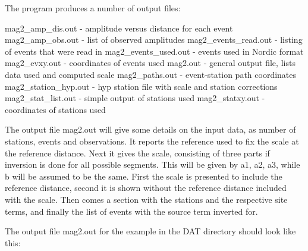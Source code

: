 The program produces a number of output files:

mag2\_amp\_dis.out - amplitude versus distance for each event\newline
mag2\_amp\_obs.out - list of observed amplitudes\newline
mag2\_events\_read.out - listing of events that were read in\newline
mag2\_events\_used.out - events used in Nordic format\newline
mag2\_evxy.out - coordinates of events used\newline
mag2.out - general output file, lists data used and computed scale\newline
mag2\_paths.out - event-station path coordinates\newline
mag2\_station\_hyp.out - hyp station file with scale and station corrections\newline
mag2\_stat\_list.out - simple output of stations used\newline
mag2\_statxy.out - coordinates of stations used\newline

The output file mag2.out will give some details on the input data, as number of 
stations, events and observations. It reports the reference used to fix the scale at 
the reference distance. Next it gives the scale, consisting of three parts if inversion 
is done for all possible segments. This will be given by a1, a2, a3, while b will be 
assumed to be the same. First the scale is presented to include the reference distance, 
second it is shown without the reference distance included with the scale. Then comes a 
section with the stations and the respective site terms, and finally the list of events 
with the source term inverted for.

The output file mag2.out for the example in the DAT directory should look like this:

